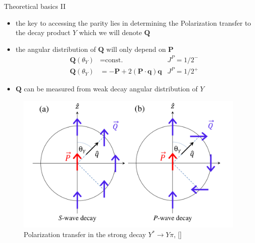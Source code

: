 \documentclass[11pt,aspectratio=1610,dvipsnames]{beamer}
\begin{document}
\begin{frame}{Theoretical basics II}
	\begin{minipage}{.59\linewidth}
		\begin{tcolorbox}[colback=black!10,colframe=gray!20!black,title=Measuring parity] 
			\begin{itemize}
				\item the key to accessing the parity lies in determining the Polarization transfer to the decay product $Y$ which we will denote $\mathbf{Q}$
				\item the angular distribution of $\mathbf{Q}$ will only depend on $\mathbf{P}$
				\begin{align*}
				\mathbf{Q}(\theta_Y)&=\text{const.} & J^P=1/2^-\\
				\mathbf{Q}(\theta_Y)&=-\mathbf{P}+2(\mathbf{P}\cdot \mathbf{q})\mathbf{q} & J^P=1/2^+
				\end{align*}
				
				\item $\mathbf{Q}$ can be measured from weak decay angular distribution of  $Y$ 
				
			\end{itemize}
		\end{tcolorbox}		
	\end{minipage}
	\begin{minipage}{.4\linewidth}
		\begin{figure}[H]
			\centering
			\includegraphics[width=\linewidth]{pol}
			\caption*{Polarization transfer in the strong decay $Y^*\to Y\pi$,  [\cite{spinparity}]}
		\end{figure}
	\end{minipage}
	
	\begin{flushright}
	\end{flushright}
\end{frame}
\end{document}
